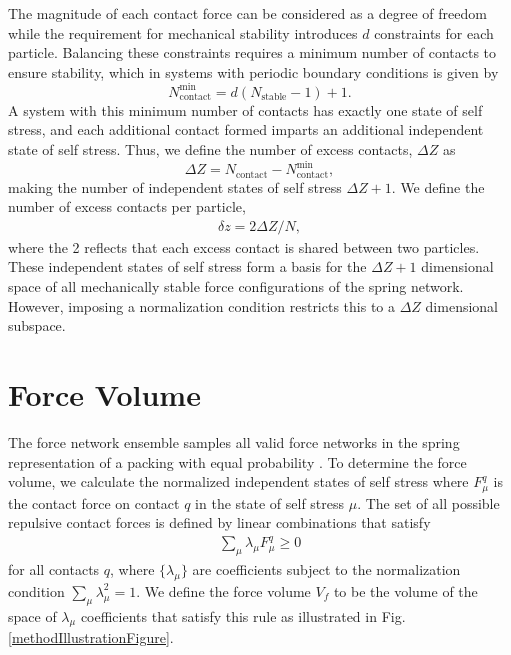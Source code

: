 The magnitude of each contact force can be considered as a degree of freedom while the requirement for mechanical stability introduces $d$ constraints for each particle.  Balancing these constraints requires a minimum number of contacts to ensure stability, which in systems with periodic boundary conditions is given by~\cite{dagois-bohy_soft-sphere_2012, goodrich_finite-size_2012}
 \begin{equation}
     N^\textrm{min}_\textrm{contact} = d(N_\textrm{stable}-1)+1.
 \end{equation} 
A system with this minimum number of contacts has exactly one state of self stress, and each additional contact formed imparts an additional independent state of self stress. Thus, we define the number of excess contacts, $\Delta Z$ as
\begin{equation}
    \Delta Z=N_\textrm{contact}-N^\textrm{min}_\textrm{contact},
\end{equation}
 making the number of independent states of self stress $\Delta Z+1$. We define the number of excess contacts per particle,
 \begin{align}
 \delta z = 2\Delta Z / N,
 \end{align}
where the 2 reflects that each excess contact is shared between two particles. These independent states of self stress form a basis for the $\Delta Z+1$ dimensional space of all mechanically stable force configurations of the spring network. However, imposing a normalization condition restricts this to a $\Delta Z$ dimensional subspace.

\section{Force Volume}
The force network ensemble samples all valid force networks in the spring representation of a packing with equal probability \cite{snoeijer_force_2004,tighe_force_2010,tighe_stress_2011}. 
To determine the force volume, we calculate the normalized independent states of self stress where $F_\mu^q$ is the contact force on contact $q$ in the state of self stress $\mu$.  The set of all possible repulsive contact forces is defined by linear combinations that satisfy
%
\begin{align}
\label{eqn:coefficientCondition}
\sum_\mu \lambda_\mu F_\mu^q \ge 0
\end{align}
%
for all contacts $q$, where $\{\lambda_\mu\}$ are coefficients subject to the normalization condition $\sum_\mu \lambda_\mu^2 = 1$.  We define the force volume $V_f$ to be the volume of the space of $\lambda_\mu$ coefficients that satisfy this rule as illustrated in Fig. \ref{methodIllustrationFigure}.  

